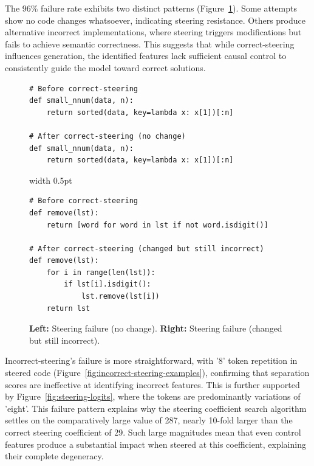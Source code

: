 The 96\% failure rate exhibits two distinct patterns (Figure~\ref{fig:steering-failures}). Some attempts show no code changes whatsoever, indicating steering resistance. Others produce alternative incorrect implementations, where steering triggers modifications but fails to achieve semantic correctness. This suggests that while correct-steering influences generation, the identified features lack sufficient causal control to consistently guide the model toward correct solutions.

\begin{figure}[!h]
\centering
\begin{minipage}[t]{0.45\linewidth}
\centering
\begin{verbatim}
# Before correct-steering
def small_nnum(data, n):
    return sorted(data, key=lambda x: x[1])[:n]

# After correct-steering (no change)
def small_nnum(data, n):
    return sorted(data, key=lambda x: x[1])[:n]
\end{verbatim}
\end{minipage}
\hspace{0.3cm}
\vrule width 0.5pt
\hspace{0.3cm}
\begin{minipage}[t]{0.45\linewidth}
\centering
\begin{verbatim}
# Before correct-steering
def remove(lst):
    return [word for word in lst if not word.isdigit()]

# After correct-steering (changed but still incorrect)
def remove(lst):
    for i in range(len(lst)):
        if lst[i].isdigit():
            lst.remove(lst[i])
    return lst
\end{verbatim}
\end{minipage}
\caption{\textbf{Left:} Steering failure (no change). \textbf{Right:} Steering failure (changed but still incorrect).}
\label{fig:steering-failures}
\end{figure}

Incorrect-steering's failure is more straightforward, with '8' token repetition in steered code (Figure~\ref{fig:incorrect-steering-examples}), confirming that separation scores are ineffective at identifying incorrect features. This is further supported by Figure~\ref{fig:steering-logits}, where the tokens are predominantly variations of 'eight'. This failure pattern explains why the steering coefficient search algorithm settles on the comparatively large value of 287, nearly 10-fold larger than the correct steering coefficient of 29. Such large magnitudes mean that even control features produce a substantial impact when steered at this coefficient, explaining their complete degeneracy.

